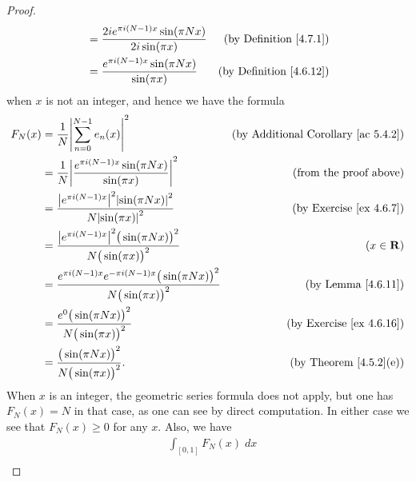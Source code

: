 \begin{proof}
\begin{align*}
                                    & = \frac{2i e^{\pi i (N - 1) x} \sin(\pi N x)}{2i \sin(\pi x)}                                                           & \text{(by Definition \ref{4.7.1})}   \\
                                    & = \frac{e^{\pi i (N - 1) x} \sin(\pi N x)}{\sin(\pi x)}                                                                 & \text{(by Definition \ref{4.6.12})}
    \end{align*}
    when \(x\) is not an integer, and hence we have the formula
    \begin{align*}
        F_N(x) & = \frac{1}{N} \abs*{\sum_{n = 0}^{N - 1} e_n(x)}^2                                                      & \text{(by Additional Corollary \ref{ac 5.4.2})} \\
               & = \frac{1}{N} \abs*{\frac{e^{\pi i (N - 1) x} \sin(\pi N x)}{\sin(\pi x)}}^2                            & \text{(from the proof above)}                   \\
               & = \frac{\abs*{e^{\pi i (N - 1) x}}^2 \abs*{\sin(\pi N x)}^2}{N \abs*{\sin(\pi x)}^2}                    & \text{(by Exercise \ref{ex 4.6.7})}             \\
               & = \frac{\abs*{e^{\pi i (N - 1) x}}^2 \big(\sin(\pi N x)\big)^2}{N \big(\sin(\pi x)\big)^2}              & (x \in \mathbf{R})                              \\
               & = \frac{e^{\pi i (N - 1) x} e^{- \pi i (N - 1) x} \big(\sin(\pi N x)\big)^2}{N \big(\sin(\pi x)\big)^2} & \text{(by Lemma \ref{4.6.11})}                  \\
               & = \frac{e^0 \big(\sin(\pi N x)\big)^2}{N \big(\sin(\pi x)\big)^2}                                       & \text{(by Exercise \ref{ex 4.6.16})}            \\
               & = \frac{\big(\sin(\pi N x)\big)^2}{N \big(\sin(\pi x)\big)^2}.                                          & \text{(by Theorem \ref{4.5.2}(e))}
    \end{align*}
    When \(x\) is an integer, the geometric series formula does not apply, but one has \(F_N(x) = N\) in that case, as one can see by direct computation.
    In either case we see that \(F_N(x) \geq 0\) for any \(x\).
    Also, we have
    \begin{align*}
         & \int_{[0, 1]} F_N(x) \; dx                                                                                                                                    \\

\end{align*}
\end{proof}
